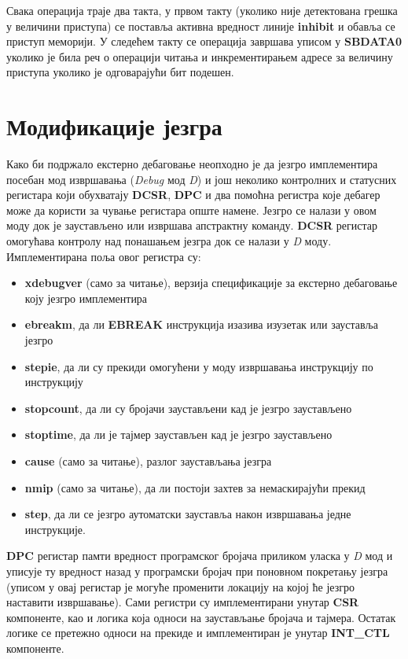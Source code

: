 Свака операција траје два такта, у првом такту (уколико није детектована грешка у величини приступа) се поставља активна вредност линије \textbf{inhibit} и обавља се приступ меморији.
У следећем такту се операција завршава уписом у \textbf{\acrshort{SBDATA}0} уколико је била реч о операцији читања и инкрементирањем адресе за величину приступа уколико је одговарајући бит подешен.

\section{Модификације језгра}

Како би подржало екстерно дебаговање неопходно је да језгро имплементира посебан мод извршавања (\textit{Debug} мод \textit{D}) и још неколико контролних и статусних регистара који обухватају \textbf{\acrshort{DCSR}}, \textbf{\acrshort{DPC}} и два помоћна регистра које дебагер може да користи за чување регистара опште намене. Језгро се налази у овом моду док је заустављено или извршава апстрактну команду. \textbf{\acrshort{DCSR}} регистар омогућава контролу над понашањем језгра док се налази у \textit{D} моду. Имплементирана поља овог регистра су:
\begin{itemize}
	\item \textbf{xdebugver} (само за читање), верзија спецификације за екстерно дебаговање коју језгро имплементира
	\item \textbf{ebreakm}, да ли \textbf{EBREAK} инструкција изазива изузетак или зауставља језгро
	\item \textbf{stepie}, да ли су прекиди омогућени у моду извршавања инструкцију по инструкцију
	\item \textbf{stopcount}, да ли су бројачи заустављени кад је језгро заустављено
	\item \textbf{stoptime}, да ли је тајмер заустављен кад је језгро заустављено
	\item \textbf{cause} (само за читање), разлог заустављања језгра
	\item \textbf{nmip} (само за читање), да ли постоји захтев за немаскирајући прекид
	\item \textbf{step}, да ли се језгро аутоматски зауставља након извршавања једне инструкције.
\end{itemize}
\textbf{\acrshort{DPC}} регистар памти вредност програмског бројача приликом уласка у \textit{D} мод и уписује ту вредност назад у програмски бројач при поновном покретању језгра (уписом у овај регистар је могуће променити локацију на којој ће језгро наставити извршавање). Сами регистри су имплементирани унутар \textbf{CSR} компоненте, као и логика која односи на заустављање бројача и тајмера. Остатак логике се претежно односи на прекиде и имплементиран је унутар \textbf{INT\_CTL} компоненте.

